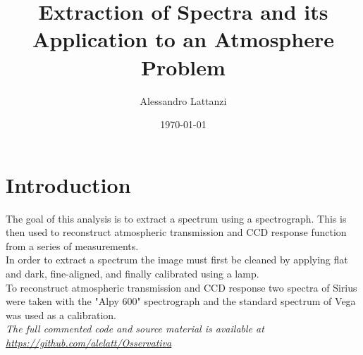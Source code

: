 \documentclass[a4paper]{article}
\title{Extraction of Spectra and its Application to an Atmosphere Problem}
\author{Alessandro Lattanzi}
\date{\today}
\begin{document}
	\maketitle
	
	\section{Introduction}
	The goal of this analysis is to extract a spectrum using a spectrograph. This is then used to reconstruct atmospheric transmission and CCD response function from a series of measurements.\\
	In order to extract a spectrum the image must first be cleaned by applying flat and dark, fine-aligned, and finally calibrated using a lamp.\\
	To reconstruct atmospheric transmission and CCD response two spectra of Sirius were taken with the "Alpy 600" spectrograph and the standard spectrum of Vega was used as a calibration.\\
	\newline
	\textit{The full commented code and source material is available at \url{https://github.com/alelatt/Osservativa}}
	
	\vspace{0.035\textheight}
	
\end{document}

